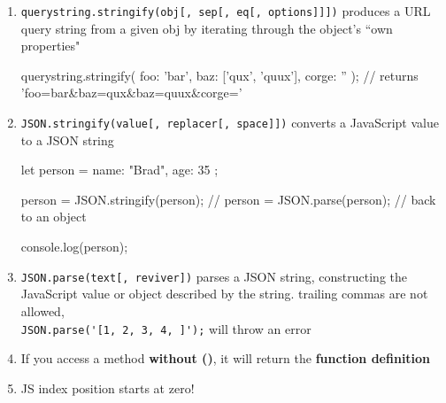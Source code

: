 \documentclass[a4paper,12pt]{article}
\begin{document}
\begin{enumerate}
\item \verb|querystring.stringify(obj[, sep[, eq[, options]]])| produces a URL query string from a given obj by iterating through the object's ``own properties"
\begin{jscode}
querystring.stringify({ foo: 'bar', baz: ['qux', 'quux'], corge: '' });
// returns 'foo=bar&baz=qux&baz=quux&corge='	
\end{jscode}

\item \verb|JSON.stringify(value[, replacer[, space]])| converts a JavaScript value to a JSON string
\begin{jscode}
let person = {
  name: "Brad",
  age: 35
};

person = JSON.stringify(person);
// person = JSON.parse(person);  // back to an object

console.log(person);
\end{jscode}

\item \verb|JSON.parse(text[, reviver])| parses a JSON string, constructing the JavaScript value or object described by the string. trailing commas are not allowed,\\ \verb|JSON.parse('[1, 2, 3, 4, ]');| will throw an error

\item If you access a method \textbf{without ()}, it will return the \textbf{function definition}

\item JS index position starts at zero!
\end{enumerate}
\end{document}
